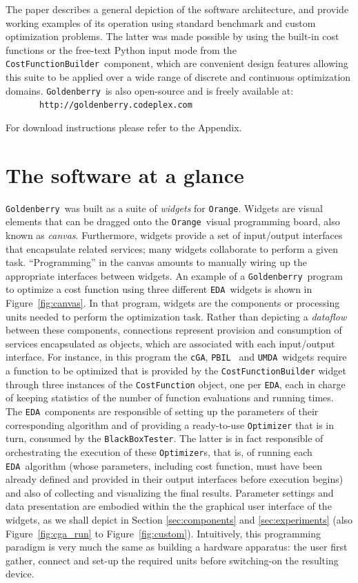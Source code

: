 \documentclass{sig-alternate}
\newcommand{\Orange}{\texttt{Orange}}
\newcommand{\GB}{\texttt{Goldenberry}}
\newcommand{\PBIL}{\texttt{PBIL}}
\newcommand{\UMDA}{\texttt{UMDA}}
\newcommand{\cGA}{\texttt{cGA}}
\newcommand{\EDA}{\texttt{EDA}}
\newcommand{\CostFunction}{\texttt{CostFunctionBuilder}}
\newcommand{\BBTester}{\texttt{BlackBoxTester}}
\newcommand{\figref}[1]{\mbox{Figure \ref{#1}}}
\begin{document}
The paper describes a general depiction of the software architecture, and provide working examples of its operation using standard benchmark and custom optimization problems. The latter was made possible by using the built-in cost functions or the free-text Python input mode from the \CostFunction~component, which are convenient design features allowing this suite to be applied over a wide range of discrete and continuous optimization domains. 
\GB~is also open-source and is freely available at: \\ \mbox{~~~~~~~}\texttt{http://goldenberry.codeplex.com}

\noindent For download instructions please refer to the Appendix.

\section{The software at a glance}
\GB~was built as a suite of \emph{widgets} for \Orange. Widgets are visual elements that can be dragged onto the \Orange~visual programming board, also known as \emph{canvas}. Furthermore, widgets provide a set of input/output interfaces that encapsulate related services; many widgets collaborate to perform a given task. ``Programming'' in the canvas amounts to manually wiring up the appropriate interfaces between widgets. An example of a \GB~program to optimize a cost function using three different \EDA~widgets is shown in \figref{fig:canvas}. In that program, widgets are the components or processing units needed to perform the optimization task.  Rather than depicting a \emph{dataflow} between these components, connections represent provision and consumption of services encapsulated as objects, which are associated with each input/output interface. For instance, in this program the \cGA, \PBIL~ and \UMDA~widgets require a function to be optimized that is provided by the \mbox{\CostFunction} widget through three instances of the \texttt{CostFunction} object, one per \EDA, each in charge of keeping statistics of the number of function evaluations and running times. The \EDA~components are responsible of setting up the parameters of their corresponding algorithm and of providing a ready-to-use \texttt{Optimizer} that is in turn, consumed by the \BBTester. The latter is in fact responsible of orchestrating the execution of these \texttt{Optimizer}s, that is, of running each \EDA~algorithm (whose parameters, including cost function, must have been already defined and provided in their output interfaces before execution begins) and also of collecting and visualizing the final results. Parameter settings and data presentation are embodied within the the graphical user interface of the widgets, as we shall depict in Section \ref{sec:components} and \ref{sec:experiments} (also \figref{fig:cga_run} to \figref{fig:custom}). Intuitively, this programming paradigm is very much the same as building a hardware apparatus: the user first gather, connect and set-up the required units before switching-on the resulting device.  
\end{document}
